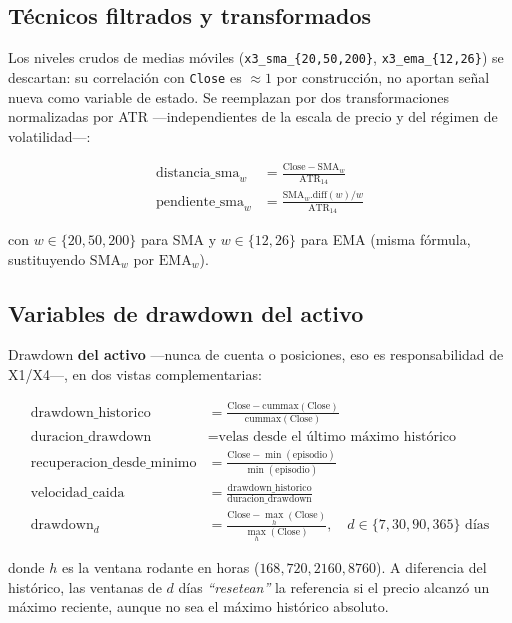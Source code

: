 \documentclass[11pt,a4paper]{article}
\newcommand{\code}[1]{\texttt{\small #1}}
\newcommand{\dq}[1]{\emph{``#1''}}
\begin{document}
\subsection{Técnicos filtrados y transformados}

Los niveles crudos de medias móviles (\code{x3\_sma\_\{20,50,200\}},
\code{x3\_ema\_\{12,26\}}) se descartan: su correlación con \code{Close} es \(\approx 1\)
por construcción, no aportan señal nueva como variable de estado. Se reemplazan por dos
transformaciones normalizadas por ATR —independientes de la escala de precio y del régimen
de volatilidad—:

\begin{align}
\text{distancia\_sma}_w &= \frac{\text{Close} - \text{SMA}_w}{\text{ATR}_{14}} \\
\text{pendiente\_sma}_w &= \frac{\text{SMA}_w.\text{diff}(w) / w}{\text{ATR}_{14}}
\end{align}

con \(w \in \{20,50,200\}\) para SMA y \(w \in \{12,26\}\) para EMA (misma fórmula,
sustituyendo \(\text{SMA}_w\) por \(\text{EMA}_w\)).

\subsection{Variables de drawdown del activo}

Drawdown \textbf{del activo} —nunca de cuenta o posiciones, eso es responsabilidad de
X1/X4—, en dos vistas complementarias:

\begin{align}
\text{drawdown\_historico} &= \frac{\text{Close} - \mathrm{cummax}(\text{Close})}
  {\mathrm{cummax}(\text{Close})} \\
\text{duracion\_drawdown} &= \text{velas desde el último máximo histórico} \\
\text{recuperacion\_desde\_minimo} &= \frac{\text{Close} - \min(\text{episodio})}
  {\min(\text{episodio})} \\
\text{velocidad\_caida} &= \frac{\text{drawdown\_historico}}{\text{duracion\_drawdown}} \\
\text{drawdown}_{d} &= \frac{\text{Close} - \max_{h}(\text{Close})}{\max_{h}(\text{Close})},
  \quad d \in \{7,30,90,365\}\text{ días}
\end{align}

donde \(h\) es la ventana rodante en horas (\(168, 720, 2160, 8760\)). A diferencia del
histórico, las ventanas de \(d\) días \dq{resetean} la referencia si el precio alcanzó un
máximo reciente, aunque no sea el máximo histórico absoluto.
\end{document}
